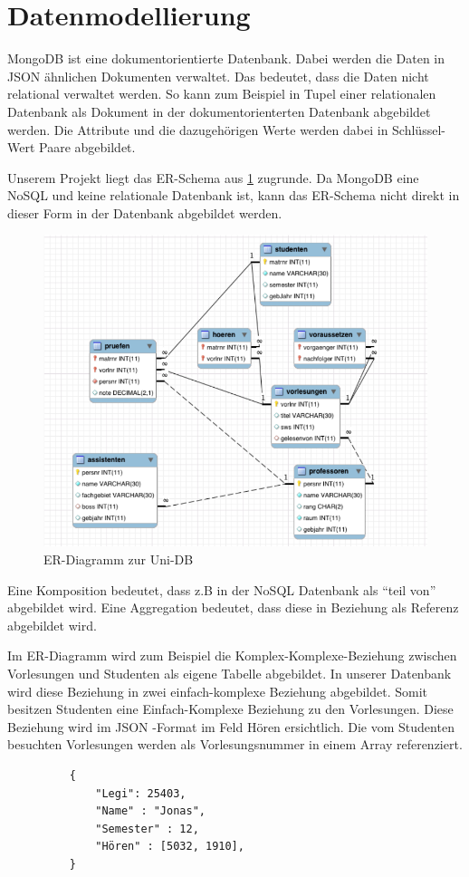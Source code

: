 \section{Datenmodellierung}
MongoDB ist eine dokumentorientierte Datenbank. Dabei werden die Daten in JSON
ähnlichen Dokumenten verwaltet. Das bedeutet, dass die Daten nicht relational
verwaltet werden. So kann zum Beispiel in Tupel einer relationalen Datenbank
als Dokument in der dokumentorienterten Datenbank abgebildet werden. Die
Attribute und die dazugehörigen Werte werden dabei in Schlüssel-Wert Paare
abgebildet. 

 Unserem Projekt liegt das ER-Schema aus \ref{fig:uni-db}
zugrunde.
Da MongoDB eine NoSQL und keine relationale Datenbank ist, kann das ER-Schema nicht direkt
in dieser Form in der Datenbank abgebildet werden. 

\begin{figure}[h] 
	\centering
		\includegraphics[width=1\textwidth]{./pictures/SQL-DB_ER_Diagramm_UNI-DB.png}
	\caption{ER-Diagramm zur Uni-DB \cite{Kaufmann2016}}
	\label{fig:uni-db}
\end{figure}

Eine Komposition bedeutet, dass z.B in der NoSQL Datenbank als ``teil von''
abgebildet wird. Eine Aggregation bedeutet, dass diese in Beziehung  als
Referenz abgebildet wird.

Im ER-Diagramm wird zum Beispiel die Komplex-Komplexe-Beziehung zwischen 
Vorlesungen und Studenten als eigene Tabelle abgebildet. In unserer Datenbank
wird diese Beziehung in zwei einfach-komplexe Beziehung abgebildet. Somit
besitzen Studenten eine Einfach-Komplexe Beziehung zu den Vorlesungen.
Diese Beziehung wird im JSON -Format im Feld Hören ersichtlich. Die vom
Studenten besuchten Vorlesungen werden als Vorlesungsnummer in einem Array
referenziert.
\begin{figure}
	\begin{verbatim}
	{
		"Legi": 25403,
		"Name" : "Jonas",
		"Semester" : 12,
		"Hören" : [5032, 1910],
	}
	\end{verbatim}
	\label{cod:vorlesung}
\end{figure}



